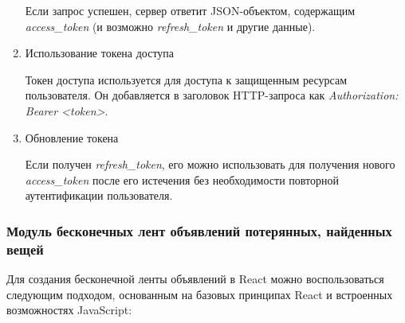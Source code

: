 \begin{enumerate}
\begin{enumerate}
	\end{enumerate}
	
	Если запрос успешен, сервер ответит JSON-объектом, содержащим \textit{access\_token} (и возможно \textit{refresh\_token} и другие данные).
	
	\item Использование токена доступа
	
	Токен доступа используется для доступа к защищенным ресурсам пользователя. Он добавляется в заголовок HTTP-запроса как \textit{Authorization: Bearer <token>}.
	
	\item Обновление токена
	
	Если получен \textit{refresh\_token}, его можно использовать для получения нового \textit{access\_token} после его истечения без необходимости повторной аутентификации пользователя.
	
\end{enumerate}


\subsubsection{Модуль бесконечных лент объявлений потерянных, найденных вещей}

Для создания бесконечной ленты объявлений в React можно воспользоваться следующим подходом, основанным на базовых принципах React и встроенных возможностях JavaScript:

